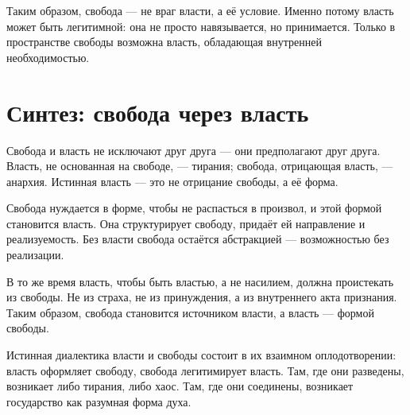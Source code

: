 Таким образом, свобода — не враг власти, а её условие. Именно потому власть может быть легитимной: она не просто навязывается, но принимается. Только в пространстве свободы возможна власть, обладающая внутренней необходимостью.


\section{Синтез: свобода через власть}

Свобода и власть не исключают друг друга — они предполагают друг друга. Власть, не основанная на свободе, — тирания; свобода, отрицающая власть, — анархия. Истинная власть — это не отрицание свободы, а её форма.

Свобода нуждается в форме, чтобы не распасться в произвол, и этой формой становится власть. Она структурирует свободу, придаёт ей направление и реализуемость. Без власти свобода остаётся абстракцией — возможностью без реализации.

В то же время власть, чтобы быть властью, а не насилием, должна проистекать из свободы. Не из страха, не из принуждения, а из внутреннего акта признания. Таким образом, свобода становится источником власти, а власть — формой свободы.

Истинная диалектика власти и свободы состоит в их взаимном оплодотворении: власть оформляет свободу, свобода легитимирует власть. Там, где они разведены, возникает либо тирания, либо хаос. Там, где они соединены, возникает государство как разумная форма духа.
